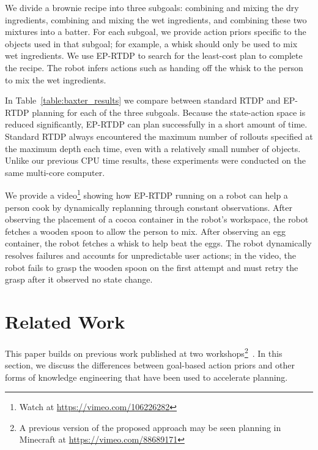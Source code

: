 \documentclass[letterpaper]{article}
\begin{document}
We divide a brownie recipe into three subgoals: combining and mixing
the dry ingredients, combining and mixing the wet ingredients, and
combining these two mixtures into a batter. For each subgoal, we
provide action priors specific to the objects used in that subgoal; for
example, a whisk should only be used to mix wet ingredients.  We use
EP-RTDP to search for the least-cost plan to complete the recipe.  The
robot infers actions such as handing off the whisk to the person to
mix the wet ingredients.

In Table~\ref{table:baxter_results} we compare between standard RTDP
and EP-RTDP planning for each of the three subgoals. Because the
state-action space is reduced significantly, EP-RTDP can plan
successfully in a short amount of time. Standard RTDP always
encountered the maximum number of rollouts specified at the maximum
depth each time, even with a relatively small number of objects.
Unlike our previous CPU time results, these experiments were conducted on the
same multi-core computer.

We provide a video\footnote{Watch at \url{https://vimeo.com/106226282}}
showing how EP-RTDP running
on a robot can help a person cook by dynamically replanning through
constant observations. After observing the placement of a cocoa
container in the robot's workspace, the robot fetches a wooden spoon
to allow the person to mix. After observing an egg container, the
robot fetches a whisk to help beat the eggs. 
The robot dynamically resolves failures and accounts for unpredictable
user actions; in the video, the robot fails to grasp the wooden spoon on
the first attempt and must retry the grasp after it observed no state
change.

\section{Related Work}
\label{sec:related-work}

This paper builds on previous work published at
two workshops\footnote{A previous version of the proposed approach may be seen planning in
Minecraft at \url{https://vimeo.com/88689171}}~\cite{barth2014affordances,abel2014toward}. 
In this section, we discuss the differences between goal-based action priors
and other forms of knowledge engineering that have been used
to accelerate planning.
\end{document}

